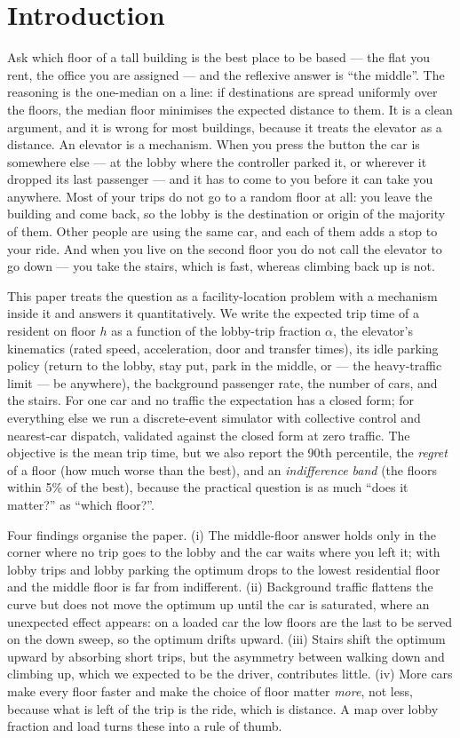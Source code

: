 \section{Introduction}
\label{sec:intro}

Ask which floor of a tall building is the best place to be based --- the flat
you rent, the office you are assigned --- and the reflexive answer is ``the
middle''. The reasoning is the one-median on a line: if destinations are
spread uniformly over the floors, the median floor minimises the expected
distance to them. It is a clean argument, and it is wrong for most buildings,
because it treats the elevator as a distance. An elevator is a mechanism. When
you press the button the car is somewhere else --- at the lobby where the
controller parked it, or wherever it dropped its last passenger --- and it has
to come to you before it can take you anywhere. Most of your trips do not go
to a random floor at all: you leave the building and come back, so the lobby
is the destination or origin of the majority of them. Other people are using
the same car, and each of them adds a stop to your ride. And when you live on
the second floor you do not call the elevator to go down --- you take the
stairs, which is fast, whereas climbing back up is not.

This paper treats the question as a facility-location problem with a
mechanism inside it and answers it quantitatively. We write the expected trip
time of a resident on floor $h$ as a function of the lobby-trip fraction
$\alpha$, the elevator's kinematics (rated speed, acceleration, door and
transfer times), its idle parking policy (return to the lobby, stay put, park
in the middle, or --- the heavy-traffic limit --- be anywhere), the background
passenger rate, the number of cars, and the stairs. For one car and no traffic
the expectation has a closed form; for everything else we run a discrete-event
simulator with collective control and nearest-car dispatch, validated against
the closed form at zero traffic. The objective is the mean trip time, but we
also report the 90th percentile, the \emph{regret} of a floor (how much worse
than the best), and an \emph{indifference band} (the floors within 5\% of the
best), because the practical question is as much ``does it matter?'' as
``which floor?''.

Four findings organise the paper. (i) The middle-floor answer holds only in
the corner where no trip goes to the lobby and the car waits where you left
it; with lobby trips and lobby parking the optimum drops to the lowest
residential floor and the middle floor is far from indifferent. (ii)
Background traffic flattens the curve but does not move the optimum up until
the car is saturated, where an unexpected effect appears: on a loaded car the
low floors are the last to be served on the down sweep, so the optimum drifts
upward. (iii) Stairs shift the optimum upward by absorbing short trips, but
the asymmetry between walking down and climbing up, which we expected to be
the driver, contributes little. (iv) More cars make every floor faster and
make the choice of floor matter \emph{more}, not less, because what is left
of the trip is the ride, which is distance. A map over lobby fraction and load
turns these into a rule of thumb.
